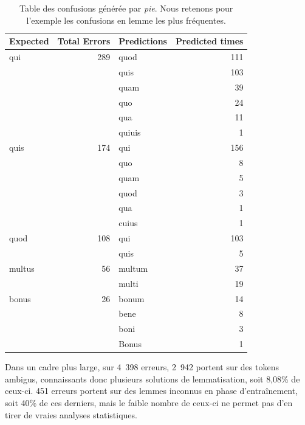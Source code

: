 \begin{table}[]
\centering
\begin{tabular}{lrlr}
\toprule
Expected & Total Errors & Predictions & Predicted times \\ \midrule
qui      & 289          & quod        & 111             \\
         &              & quis        & 103             \\
         &              & quam        & 39              \\
         &              & quo         & 24              \\
         &              & qua         & 11              \\
         &              & quiuis      & 1               \\
quis     & 174          & qui         & 156             \\
         &              & quo         & 8               \\
         &              & quam        & 5               \\
         &              & quod        & 3               \\
         &              & qua         & 1               \\
         &              & cuius       & 1               \\
quod     & 108          & qui         & 103             \\
         &              & quis        & 5               \\
multus   & 56           & multum      & 37              \\
         &              & multi       & 19              \\
bonus    & 26           & bonum       & 14              \\
         &              & bene        & 8               \\
         &              & boni        & 3               \\
         &              & Bonus       & 1               \\ \bottomrule
\end{tabular}
\caption{Table des confusions générée par \textit{pie}. Nous retenons pour l'exemple les confusions en lemme les plus fréquentes.}
\label{lemma:confusion-table}
\end{table}

Dans un cadre plus large, sur 4~398 erreurs, 2~942 portent sur des tokens ambigus, connaissants donc plusieurs solutions de lemmatisation, soit 8,08\% de ceux-ci. 451 erreurs portent sur des lemmes inconnus en phase d'entraînement, soit 40\% de ces derniers, mais le faible nombre de ceux-ci ne permet pas d'en tirer de vraies analyses statistiques.

